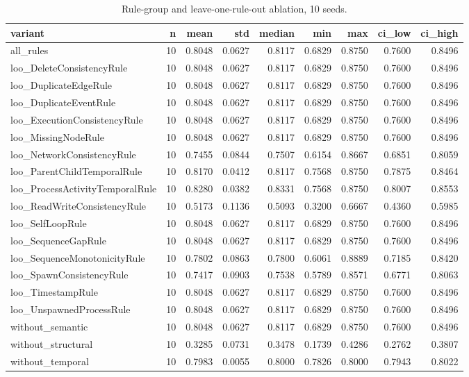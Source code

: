 \begin{table}[htbp]
\centering
\caption{Rule-group and leave-one-rule-out ablation, 10 seeds.}
\label{tab:ablation}
\begin{tabular}{lrrrrrrrr}
\hline
variant & n & mean & std & median & min & max & ci_low & ci_high \\
\hline
all_rules & 10 & 0.8048 & 0.0627 & 0.8117 & 0.6829 & 0.8750 & 0.7600 & 0.8496 \\
loo_DeleteConsistencyRule & 10 & 0.8048 & 0.0627 & 0.8117 & 0.6829 & 0.8750 & 0.7600 & 0.8496 \\
loo_DuplicateEdgeRule & 10 & 0.8048 & 0.0627 & 0.8117 & 0.6829 & 0.8750 & 0.7600 & 0.8496 \\
loo_DuplicateEventRule & 10 & 0.8048 & 0.0627 & 0.8117 & 0.6829 & 0.8750 & 0.7600 & 0.8496 \\
loo_ExecutionConsistencyRule & 10 & 0.8048 & 0.0627 & 0.8117 & 0.6829 & 0.8750 & 0.7600 & 0.8496 \\
loo_MissingNodeRule & 10 & 0.8048 & 0.0627 & 0.8117 & 0.6829 & 0.8750 & 0.7600 & 0.8496 \\
loo_NetworkConsistencyRule & 10 & 0.7455 & 0.0844 & 0.7507 & 0.6154 & 0.8667 & 0.6851 & 0.8059 \\
loo_ParentChildTemporalRule & 10 & 0.8170 & 0.0412 & 0.8117 & 0.7568 & 0.8750 & 0.7875 & 0.8464 \\
loo_ProcessActivityTemporalRule & 10 & 0.8280 & 0.0382 & 0.8331 & 0.7568 & 0.8750 & 0.8007 & 0.8553 \\
loo_ReadWriteConsistencyRule & 10 & 0.5173 & 0.1136 & 0.5093 & 0.3200 & 0.6667 & 0.4360 & 0.5985 \\
loo_SelfLoopRule & 10 & 0.8048 & 0.0627 & 0.8117 & 0.6829 & 0.8750 & 0.7600 & 0.8496 \\
loo_SequenceGapRule & 10 & 0.8048 & 0.0627 & 0.8117 & 0.6829 & 0.8750 & 0.7600 & 0.8496 \\
loo_SequenceMonotonicityRule & 10 & 0.7802 & 0.0863 & 0.7800 & 0.6061 & 0.8889 & 0.7185 & 0.8420 \\
loo_SpawnConsistencyRule & 10 & 0.7417 & 0.0903 & 0.7538 & 0.5789 & 0.8571 & 0.6771 & 0.8063 \\
loo_TimestampRule & 10 & 0.8048 & 0.0627 & 0.8117 & 0.6829 & 0.8750 & 0.7600 & 0.8496 \\
loo_UnspawnedProcessRule & 10 & 0.8048 & 0.0627 & 0.8117 & 0.6829 & 0.8750 & 0.7600 & 0.8496 \\
without_semantic & 10 & 0.8048 & 0.0627 & 0.8117 & 0.6829 & 0.8750 & 0.7600 & 0.8496 \\
without_structural & 10 & 0.3285 & 0.0731 & 0.3478 & 0.1739 & 0.4286 & 0.2762 & 0.3807 \\
without_temporal & 10 & 0.7983 & 0.0055 & 0.8000 & 0.7826 & 0.8000 & 0.7943 & 0.8022 \\
\hline
\end{tabular}
\end{table}
